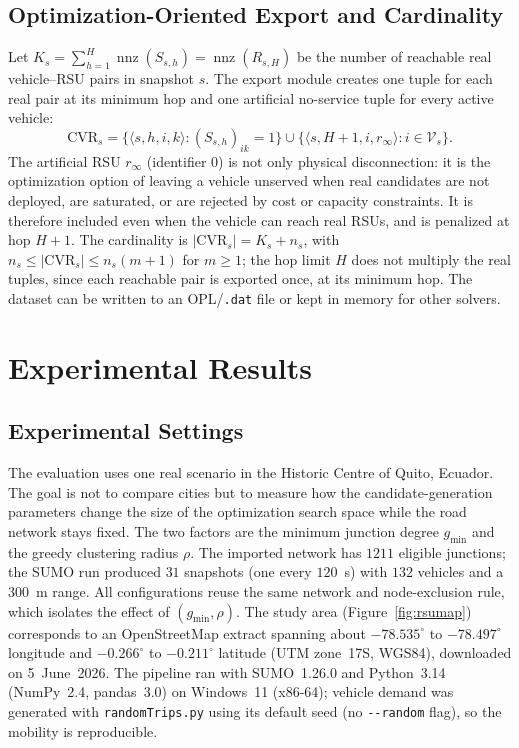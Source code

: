 \documentclass[engproc,proceedingpaper,submit,oneauthor]{Definitions/mdpi}
\newcommand{\nnz}{\operatorname{nnz}}
\newcommand{\CVR}{\mathrm{CVR}}
\begin{document}
\subsection{Optimization-Oriented Export and Cardinality}
Let $K_s=\sum_{h=1}^{H}\nnz(S_{s,h})=\nnz(R_{s,H})$ be the number of reachable real
vehicle--RSU pairs in snapshot $s$. The export module creates one tuple for each real
pair at its minimum hop and one artificial no-service tuple for every active vehicle:
\[
\CVR_s=
\{\langle s,h,i,k\rangle:(S_{s,h})_{ik}=1\}
\cup
\{\langle s,H+1,i,r_\infty\rangle:i\in\mathcal V_s\}.
\]
The artificial RSU $r_\infty$ (identifier $0$) is not only physical disconnection: it
is the optimization option of leaving a vehicle unserved when real candidates are not
deployed, are saturated, or are rejected by cost or capacity constraints. It is
therefore included even when the vehicle can reach real RSUs, and is penalized at hop
$H+1$. The cardinality is $|\CVR_s|=K_s+n_s$, with $n_s\le|\CVR_s|\le n_s(m+1)$ for
$m\ge 1$; the hop limit $H$ does not multiply the real tuples, since each reachable
pair is exported once, at its minimum hop. The dataset can be written to an
OPL/\texttt{.dat} file or kept in memory for other solvers.

\section{Experimental Results}\label{sec:results}

\subsection{Experimental Settings}
The evaluation uses one real scenario in the Historic Centre of Quito, Ecuador. The
goal is not to compare cities but to measure how the candidate-generation parameters
change the size of the optimization search space while the road network stays fixed.
The two factors are the minimum junction degree $g_{\min}$ and the greedy clustering
radius $\rho$. The imported network has $1211$ eligible junctions; the SUMO run
produced $31$ snapshots (one every $120$~s) with $132$ vehicles and a $300$~m range.
All configurations reuse the same network and node-exclusion rule, which isolates the
effect of $(g_{\min},\rho)$. The study area (Figure~\ref{fig:rsumap}) corresponds to an
OpenStreetMap extract spanning about $-78.535^{\circ}$ to $-78.497^{\circ}$ longitude
and $-0.266^{\circ}$ to $-0.211^{\circ}$ latitude (UTM zone~17S, WGS84), downloaded on
5~June~2026. The pipeline ran with SUMO~1.26.0 and Python~3.14 (NumPy~2.4, pandas~3.0)
on Windows~11 (x86-64); vehicle demand was generated with \texttt{randomTrips.py} using
its default seed (no \texttt{-{}-random} flag), so the mobility is reproducible.
\end{document}
